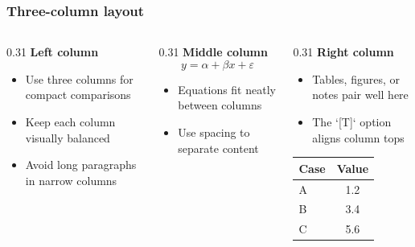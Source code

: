 \expandafter\documentclass\expandafter[\presentationclassoptions]{beamer}
\begin{document}
\begin{frame}
  \frametitle{Three-column layout}
  \small
  \singlespacing
  \begin{columns}[T,onlytextwidth]
    \begin{column}{0.31\textwidth}
      \textbf{Left column}
      \begin{itemize}
        \item Use three columns for compact comparisons
        \item Keep each column visually balanced
        \item Avoid long paragraphs in narrow columns
      \end{itemize}
    \end{column}
    \begin{column}{0.31\textwidth}
      \textbf{Middle column}
      \begin{equation*}
        y = \alpha + \beta x + \varepsilon
      \end{equation*}
      \begin{itemize}
        \item Equations fit neatly between columns
        \item Use spacing to separate content
      \end{itemize}
    \end{column}
    \begin{column}{0.31\textwidth}
      \textbf{Right column}
      \begin{itemize}
        \item Tables, figures, or notes pair well here
        \item The `[T]` option aligns column tops
      \end{itemize}

      \begin{tabular*}{\linewidth}{@{\extracolsep\fill}lc}
        \toprule
        Case & Value\\
        \midrule
        A & 1.2\\
        B & 3.4\\
        C & 5.6\\
        \bottomrule
      \end{tabular*}
    \end{column}
  \end{columns}
\end{frame}
\end{document}
